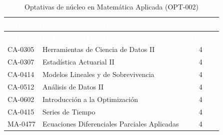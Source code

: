 \begingroup
\small
{}%
\renewcommand{\arraystretch}{1.2}%
%
\begin{longtable}{|l|>{\raggedright\arraybackslash}p{9.4cm}|c|}
\caption{Optativas de núcleo en Matemática Aplicada (OPT-002)}\label{res:opt002}\\
\hline
\rowcolor{Azul-UCR}
\textcolor{white}{\textbf{Sigla}} & \textcolor{white}{\textbf{Nombre del curso}} & \textcolor{white}{\textbf{Créditos}} \\ \hline
\endfirsthead
\hline
\rowcolor{Azul-UCR}
\textcolor{white}{\textbf{Sigla}} & \textcolor{white}{\textbf{Nombre del curso}} & \textcolor{white}{\textbf{Créditos}} \\ \hline
\endhead
\hline
\endfoot
CA-0305 & Herramientas de Ciencia de Datos II & 4 \\ \hline
CA-0307 & Estadística Actuarial II & 4 \\ \hline
CA-0414 & Modelos Lineales y de Sobrevivencia & 4 \\ \hline
CA-0512 & Análisis de Datos II & 4 \\ \hline
CA-0602 & Introducción a la Optimización & 4 \\ \hline
CA-0415 & Series de Tiempo & 4 \\ \hline
MA-0477 & Ecuaciones Diferenciales Parciales Aplicadas & 4 \\ \hline
\end{longtable}
\endgroup

